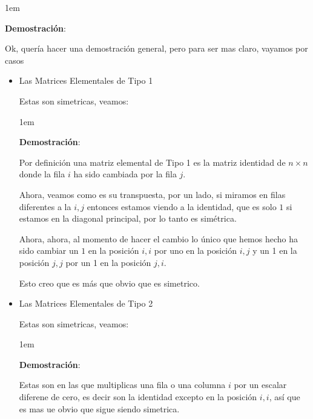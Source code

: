 \documentclass[12pt, fleqn]{article}                             %
\newenvironment{SmallIndentation}[1][0.75em]                    %
        {\begin{adjustwidth}{#1}{}\begin{footnotesize}}             %
        {\end{footnotesize}\end{adjustwidth}}                       %
\theoremstyle{break}                                            %
\begin{document}
    \begin{SmallIndentation}[1em]
        \textbf{Demostración}:
        
        Ok, quería hacer una demostración general, pero para ser mas claro, vayamos por casos
        \begin{itemize}
            \item Las Matrices Elementales de Tipo 1

                Estas son simetricas, veamos:
                \begin{SmallIndentation}[1em]
                    \textbf{Demostración}:
                    
                    Por definición una matriz elemental de Tipo 1 es la matriz identidad de $n \times n$
                    donde la fila $i$ ha sido cambiada por la fila $j$.

                    Ahora, veamos como es su transpuesta, por un lado, si miramos en filas diferentes a la $i, j$
                    entonces estamos viendo a la identidad, que es solo $1$ si estamos en la diagonal principal, por
                    lo tanto es simétrica.

                    Ahora, ahora, al momento de hacer el cambio lo único que hemos hecho ha sido cambiar un $1$ en la
                    posición $i, i$ por uno en la posición $i, j$ y un 1 en la posición $j, j$ por un 1 en la posición $j, i$.

                    Esto creo que es más que obvio que es simetrico.

                \end{SmallIndentation}

            \item Las Matrices Elementales de Tipo 2

                Estas son simetricas, veamos:
                \begin{SmallIndentation}[1em]
                    \textbf{Demostración}:
                    
                    Estas son en las que multiplicas una fila o una columna $i$ por un escalar diferene de cero, es decir son la identidad
                    excepto en la posición $i, i$, así que es mas ue obvio que sigue siendo simetrica.
                
                \end{SmallIndentation}
                    

\end{itemize}
\end{SmallIndentation}
\end{document}
